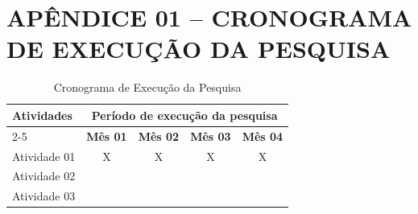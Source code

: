 \section*{APÊNDICE 01 – CRONOGRAMA DE EXECUÇÃO DA PESQUISA}
\label{sec:apendice-1}



\begin{table}[H]
    \centering
    \begin{tabular}{|l|c|c|c|c|}
        \hline
        \multirow{2}{7.5cm}{\textbf{Atividades}} & \multicolumn{4}{c|}{\textbf{Período de execução da pesquisa}} \\ \cline{2-5}
        & \textbf{Mês 01} & \textbf{Mês 02} & \textbf{Mês 03} & \textbf{Mês 04} \\ \hline
        Atividade 01 & X & X & X & X \\ \hline
        Atividade 02 &   &   &   &   \\ \hline
        Atividade 03 &   &   &   &   \\ \hline
    \end{tabular}
\caption{Cronograma de Execução da Pesquisa}
\end{table}
    